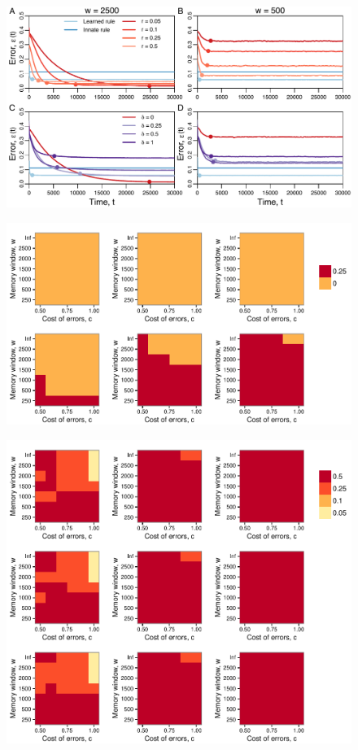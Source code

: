 \begin{figure}
\includegraphics[width=6.85in]{figures/speed_accuracy_tradeoff.pdf}
\caption{\sffamily\small\textbf{}}
\label{tradeoff}
\end{figure}


\begin{figure}
\includegraphics[width=6.85in]{figures/delta_heat_map.pdf}
\caption{\sffamily\small\textbf{}}
\label{delta}
\end{figure}

\begin{figure}
\includegraphics[width=6.85in]{figures/l_heat_map.pdf}
\caption{\sffamily\small\textbf{}}
\label{l}
\end{figure}

